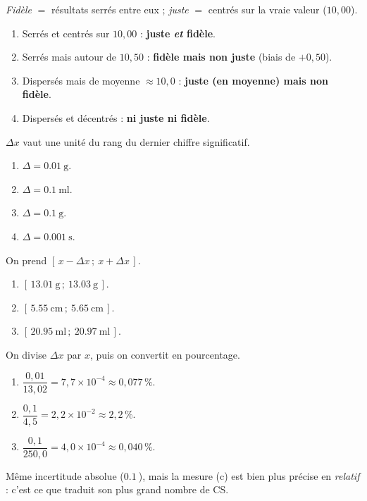 \documentclass[11pt,a4paper]{article}
\begin{document}
\begin{corrige}
\emph{Fidèle} $=$ résultats serrés entre eux ; \emph{juste} $=$ centrés sur la vraie valeur ($10,00$).
\begin{enumerate}[label=\alph*)]
  \item Serrés et centrés sur $10,00$ : \textbf{juste \emph{et} fidèle}.
  \item Serrés mais autour de $10,50$ : \textbf{fidèle mais non juste} (biais de $+0,50$).
  \item Dispersés mais de moyenne $\approx 10,0$ : \textbf{juste (en moyenne) mais non fidèle}.
  \item Dispersés et décentrés : \textbf{ni juste ni fidèle}.
\end{enumerate}
\end{corrige}

\begin{corrige}
$\Delta x$ vaut une unité du rang du dernier chiffre significatif.
\begin{enumerate}[label=\alph*)]
  \item $\Delta = \qty{0,01}{\gram}$.
  \item $\Delta = \qty{0,1}{\milli\litre}$.
  \item $\Delta = \qty{0,1}{\gram}$.
  \item $\Delta = \qty{0,001}{\second}$.
\end{enumerate}
\end{corrige}

\begin{corrige}
On prend $[\,x-\Delta x\,;\ x+\Delta x\,]$.
\begin{enumerate}[label=\alph*)]
  \item $[\,\qty{13,01}{\gram}\,;\ \qty{13,03}{\gram}\,]$.
  \item $[\,\qty{5,55}{\centi\metre}\,;\ \qty{5,65}{\centi\metre}\,]$.
  \item $[\,\qty{20,95}{\milli\litre}\,;\ \qty{20,97}{\milli\litre}\,]$.
\end{enumerate}
\end{corrige}

\begin{corrige}
On divise $\Delta x$ par $x$, puis on convertit en pourcentage.
\begin{enumerate}[label=\alph*)]
  \item $\dfrac{0,01}{13,02}=7,7\times10^{-4}\approx \boxed{0,077\,\%}$.
  \item $\dfrac{0,1}{4,5}=2,2\times10^{-2}\approx \boxed{2,2\,\%}$.
  \item $\dfrac{0,1}{250,0}=4,0\times10^{-4}\approx \boxed{0,040\,\%}$.
\end{enumerate}
Même incertitude absolue ($\qty{0,1}{}$), mais la mesure (c) est bien plus précise en \emph{relatif} :
c'est ce que traduit son plus grand nombre de CS.
\end{corrige}
\end{document}
